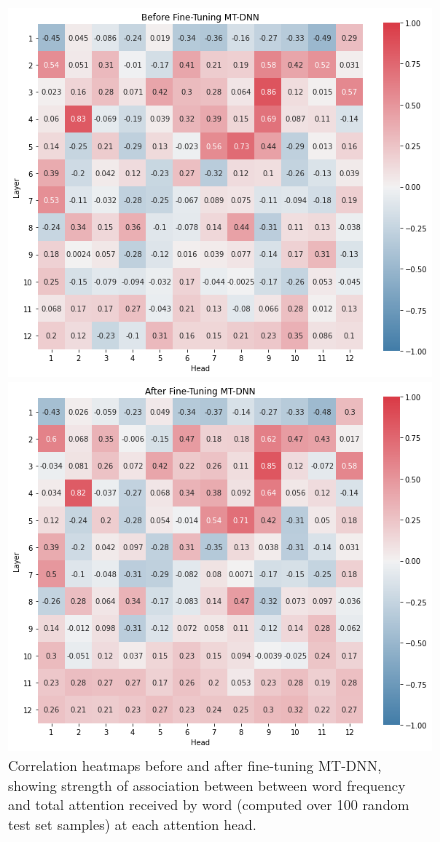 \documentclass{dcthesis}
\theoremstyle{definition}
\theoremstyle{remark}
\begin{document}
\begin{figure}
  \centering
  \begin{minipage}[b]{0.45\textwidth}
    \includegraphics[scale=0.34]{pretrained_head_correlations_tf.png}
  \end{minipage}
  \hfill
  \begin{minipage}[b]{0.45\textwidth}
    \includegraphics[scale=0.34]{finetuned_head_correlations_tf.png}
  \end{minipage}
  \caption{\label{fig:head_correlations_tf} Correlation heatmaps before and after fine-tuning MT-DNN, showing strength of association between between word frequency and total attention received by word (computed over 100 random test set samples) at each attention head.}
\end{figure}
\end{document}
